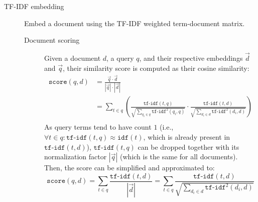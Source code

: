 \begin{description}
    \item[TF-IDF embedding] 
        Embed a document using the TF-IDF weighted term-document matrix.

        \begin{description}
            \item[Document scoring]
                Given a document $d$, a query $q$, and their respective embeddings $\vec{d}$ and $\vec{q}$, their similarity score is computed as their cosine similarity:
                \[
                    \begin{split}
                        \texttt{score}(q, d) &= \frac{\vec{q} \cdot \vec{d}}{|\vec{q}| \cdot |\vec{d}|} \\
                        &= \sum_{t \in q} \left( \frac{\texttt{tf-idf}(t, q)}{\sqrt{\sum_{q_i \in q} \texttt{tf-idf}^2(q_i, q)}} \cdot \frac{\texttt{tf-idf}(t, d)}{\sqrt{\sum_{d_i \in d} \texttt{tf-idf}^2(d_i, d)}} \right) \\
                    \end{split}
                \]
                As query terms tend to have count $1$ (i.e., $\forall t \in q: \texttt{tf-idf}(t, q) \approx \texttt{idf}(t)$, which is already present in $\texttt{tf-idf}(t, d)$), $\texttt{tf-idf}(t, q)$ can be dropped together with its normalization factor $|\vec{q}|$ (which is the same for all documents). Then, the score can be simplified and approximated to:
                \[ \texttt{score}(q, d) = \sum_{t \in q} \frac{\texttt{tf-idf}(t, d)}{|\vec{d}|} = \sum_{t \in q} \frac{\texttt{tf-idf}(t, d)}{\sqrt{\sum_{d_i \in d} \texttt{tf-idf}^2(d_i, d)}} \]


\end{description}
\end{description}

